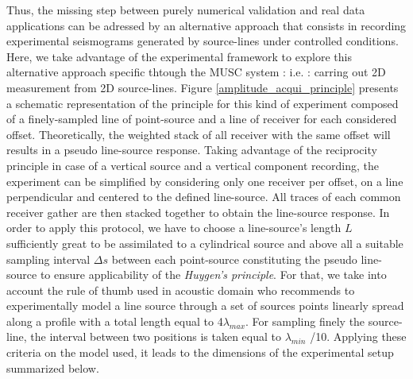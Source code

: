 \documentclass[manuscript,revised]{geophysics}
\begin{document}
\noindent Thus, the missing step between purely numerical validation and real data applications can be adressed by an alternative approach that consists in recording experimental seismograms generated by source-lines under controlled conditions. Here, we take advantage of the experimental framework to explore this alternative approach specific thtough the MUSC system : i.e. : carring out 2D measurement from 2D source-lines. Figure \ref{amplitude_acqui_principle} presents a schematic representation of the principle for this kind of experiment composed of a finely-sampled line of point-source and a line of receiver for each considered offset. Theoretically, the weighted stack of all receiver with the same offset will results in a pseudo line-source response. Taking advantage of the reciprocity principle in case of a vertical source and a vertical component recording, the experiment can be simplified by considering only one receiver per offset, on a line perpendicular and centered to the defined line-source. All traces of each common receiver gather are then stacked together to obtain the line-source response. In order to apply this protocol, we have to choose a line-source's length $L$ sufficiently great to be assimilated to a cylindrical source and above all a suitable sampling interval $\Delta s$ between each point-source constituting the pseudo line-source to ensure applicability of the \textit{Huygen's principle}. For that, we take into account the rule of thumb used in acoustic domain who recommends to experimentally model a line source through a set of sources points linearly spread along a profile with a total length equal to 4$\lambda_{max}$. For sampling finely the source-line, the interval between two positions is taken equal to  $\lambda_{min}$ /10. Applying these criteria on the model used, it leads to the dimensions of the experimental setup summarized below. 
\end{document}
